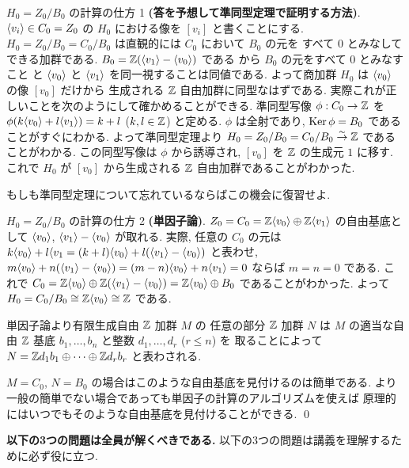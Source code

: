 \documentclass[12pt,twoside]{jarticle}
\begin{document}
\begin{example}
  $H_0=Z_0/B_0$ の計算の仕方 1 {\bf (答を予想して準同型定理で証明する方法)}.
  $\langle v_i\rangle\in C_0=Z_0$ の $H_0$ における像を $[v_i]$ と書くことにする.
  $H_0=Z_0/B_0=C_0/B_0$ は直観的には $C_0$ において $B_0$ の元を
  すべて $0$ とみなしてできる加群である. 
  $B_0={\mathbb Z}(\langle v_1\rangle-\langle v_0\rangle)$ である
  から $B_0$ の元をすべて $0$ とみなすこと
  と $\langle v_0\rangle$ と $\langle v_1\rangle$ を同一視することは同値である.
  よって商加群 $H_0$ は $\langle v_0\rangle$ の像 $[v_0]$ だけから
  生成される ${\mathbb Z}$ 自由加群に同型なはずである. 
  実際これが正しいことを次のようにして確かめることができる.
  準同型写像 $\phi:C_0\to{\mathbb Z}$ を $\phi(k\langle v_0\rangle+l\langle v_1\rangle)=k+l$ 
  ($k,l\in{\mathbb Z}$) と定める. 
  $\phi$ は全射であり, $\mathop{\mathrm{Ker}}\nolimits\phi=B_0$ であることがすぐにわかる.
  よって準同型定理より $H_0=Z_0/B_0=C_0/B_0\overset\sim\rightarrow{\mathbb Z}$ であることがわかる.
  この同型写像は $\phi$ から誘導され, $[v_0]$ を ${\mathbb Z}$ の生成元 $1$ に移す.
  これで $H_0$ が $[v_0]$ から生成される ${\mathbb Z}$ 自由加群であることがわかった.

  もしも準同型定理について忘れているならばこの機会に復習せよ.

  $H_0=Z_0/B_0$ の計算の仕方 2 {\bf (単因子論)}.
  $Z_0=C_0={\mathbb Z}\langle v_0\rangle\oplus{\mathbb Z}\langle v_1\rangle$ の自由基底と
  して $\langle v_0\rangle$, $\langle v_1\rangle - \langle v_0\rangle$ が取れる.
  実際, 任意の $C_0$ の元は $k\langle v_0\rangle+l\langle v_1
  = (k+l)\langle v_0\rangle + l(\langle v_1\rangle - \langle v_0\rangle)$ と表わせ,
  $m\langle v_0\rangle + n(\langle v_1\rangle - \langle v_0\rangle)
  =(m-n)\langle v_0\rangle + n\langle v_1\rangle = 0$ ならば $m=n=0$ である.
  これで $C_0={\mathbb Z}\langle v_0\rangle\oplus{\mathbb Z}(\langle v_1\rangle - \langle v_0\rangle)
  = {\mathbb Z}\langle v_0\rangle\oplus B_0$ であることがわかった.
  よって $H_0=C_0/B_0\cong {\mathbb Z}\langle v_0\rangle\cong {\mathbb Z}$ である.

  単因子論より有限生成自由 ${\mathbb Z}$ 加群 $M$ の
  任意の部分 ${\mathbb Z}$ 加群 $N$ は $M$ の適当な自由 ${\mathbb Z}$ 基底 $b_1,\ldots,b_n$ 
  と整数 $d_1,\ldots,d_r$ ($r\le n$) を
  取ることによって $N={\mathbb Z} d_1b_1\oplus\cdots\oplus{\mathbb Z} d_rb_r$ と表わされる.

  $M=C_0$, $N=B_0$ の場合はこのような自由基底を見付けるのは簡単である. 
  より一般の簡単でない場合であっても単因子の計算のアルゴリズムを使えば
  原理的にはいつでもそのような自由基底を見付けることができる.
  \qed
\end{example}

{\bf 以下の3つの問題は全員が解くべきである.}
以下の3つの問題は講義を理解するために必ず役に立つ.
\end{document}
